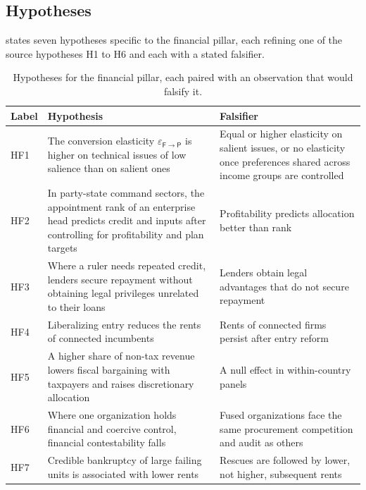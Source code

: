\documentclass[11pt,letterpaper]{article}
\theoremstyle{definition}
\theoremstyle{remark}
\newcommand{\pF}{\mathsf{F}}
\newcommand{\pP}{\mathsf{P}}
\begin{document}
\subsection{Hypotheses}

 states seven hypotheses specific to the financial pillar, each refining one of the source hypotheses H1 to H6 and each with a stated falsifier.

\begin{table}[t]
\centering
\small
\caption{Hypotheses for the financial pillar, each paired with an observation that would falsify it.}
\label{tab:hypotheses}
\begin{tabularx}{\linewidth}{@{}L{1.1cm}YY@{}}
\toprule
Label & Hypothesis & Falsifier \\
\midrule
HF1 & The conversion elasticity $\varepsilon_{\pF\to\pP}$ is higher on technical issues of low salience than on salient ones & Equal or higher elasticity on salient issues, or no elasticity once preferences shared across income groups are controlled \\
HF2 & In party-state command sectors, the appointment rank of an enterprise head predicts credit and inputs after controlling for profitability and plan targets & Profitability predicts allocation better than rank \\
HF3 & Where a ruler needs repeated credit, lenders secure repayment without obtaining legal privileges unrelated to their loans & Lenders obtain legal advantages that do not secure repayment \\
HF4 & Liberalizing entry reduces the rents of connected incumbents & Rents of connected firms persist after entry reform \\
HF5 & A higher share of non-tax revenue lowers fiscal bargaining with taxpayers and raises discretionary allocation & A null effect in within-country panels \\
HF6 & Where one organization holds financial and coercive control, financial contestability falls & Fused organizations face the same procurement competition and audit as others \\
HF7 & Credible bankruptcy of large failing units is associated with lower rents & Rescues are followed by lower, not higher, subsequent rents \\
\bottomrule
\end{tabularx}
\end{table}
\end{document}
